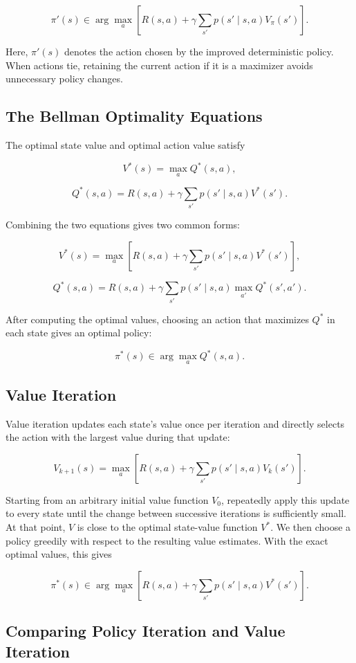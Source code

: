 \documentclass[a4paper,10pt]{article}
\begin{document}
\[
\pi'(s)\in\arg\max_a
\left[R(s,a)+\gamma\sum_{s'}p(s'\mid s,a)V_\pi(s')\right].
\]

Here, \(\pi'(s)\) denotes the action chosen by the improved deterministic policy. When actions tie, retaining the current action if it is a maximizer avoids unnecessary policy changes.

\subsection{The Bellman Optimality Equations}

The optimal state value and optimal action value satisfy

\[
V^*(s)=\max_a Q^*(s,a),
\]

\[
Q^*(s,a)=R(s,a)+\gamma\sum_{s'}p(s'\mid s,a)V^*(s').
\]

Combining the two equations gives two common forms:

\[
V^*(s)=\max_a\left[R(s,a)+\gamma\sum_{s'}p(s'\mid s,a)V^*(s')\right],
\]

\[
Q^*(s,a)=R(s,a)+\gamma\sum_{s'}p(s'\mid s,a)\max_{a'}Q^*(s',a').
\]

After computing the optimal values, choosing an action that maximizes \(Q^*\) in each state gives an optimal policy:

\[
\pi^*(s)\in\arg\max_a Q^*(s,a).
\]

\subsection{Value Iteration}

Value iteration updates each state's value once per iteration and directly selects the action with the largest value during that update:

\[
V_{k+1}(s)=\max_a\left[R(s,a)+\gamma\sum_{s'}p(s'\mid s,a)V_k(s')\right].
\]

Starting from an arbitrary initial value function \(V_0\), repeatedly apply this update to every state until the change between successive iterations is sufficiently small. At that point, \(V\) is close to the optimal state-value function \(V^*\). We then choose a policy greedily with respect to the resulting value estimates. With the exact optimal values, this gives

\[
\pi^*(s)\in\arg\max_a
\left[R(s,a)+\gamma\sum_{s'}p(s'\mid s,a)V^*(s')\right].
\]

\subsection{Comparing Policy Iteration and Value Iteration}
\end{document}
